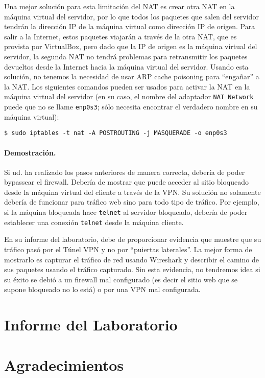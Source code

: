 Una mejor solución para esta limitación del NAT es crear otra NAT en la máquina virtual del servidor, por lo que todos los paquetes que salen del servidor tendrán la dirección IP de la máquina virtual como dirección IP de origen.
Para salir a la Internet, estos paquetes viajarán a través de la otra NAT, que es provista por VirtualBox, pero dado que la IP de origen es la máquina virtual del servidor, la segunda NAT no tendrá problemas para retransmitir los paquetes devueltos desde la Internet hacia la máquina virtual del servidor. Usando esta solución, no tenemos la necesidad de usar ARP cache poisoning para ``engañar'' a la NAT. Los siguientes comandos pueden ser usados para activar la NAT en la máquina virtual del servidor (en su caso, el nombre del adaptador \texttt{NAT Network} puede que no se llame \texttt{enp0s3}; sólo necesita encontrar el verdadero nombre en su máquina virtual):

    
\begin{lstlisting}
$ sudo iptables -t nat -A POSTROUTING -j MASQUERADE -o enp0s3
\end{lstlisting}
    

\paragraph{Demostración.}
Si ud. ha realizado los pasos anteriores de manera correcta, debería de poder bypassear el firewall. Debería de mostrar que puede acceder al sitio bloqueado desde la máquina virtual del cliente a través de la VPN. Su solución no solamente debería de funcionar para tráfico web sino para todo tipo de tráfico. Por ejemplo, si la máquina bloqueada hace \texttt{telnet} al servidor bloqueado, debería de poder establecer una conexión \texttt{telnet} desde la máquina cliente.

En su informe del laboratorio, debe de proporcionar evidencia que muestre que su tráfico pasó por el Túnel VPN y no por ``puiertas laterales''. La mejor forma de mostrarlo es capturar el tráfico de red usando Wireshark y describir el camino de sus paquetes usando el tráfico capturado. Sin esta evidencia, no tendremos idea si su éxito se debió a un firewall mal configurado (es decir el sitio web que se supone bloqueado no lo está) o por una VPN mal configurada.

\section{Informe del Laboratorio}



\section*{Agradecimientos}






